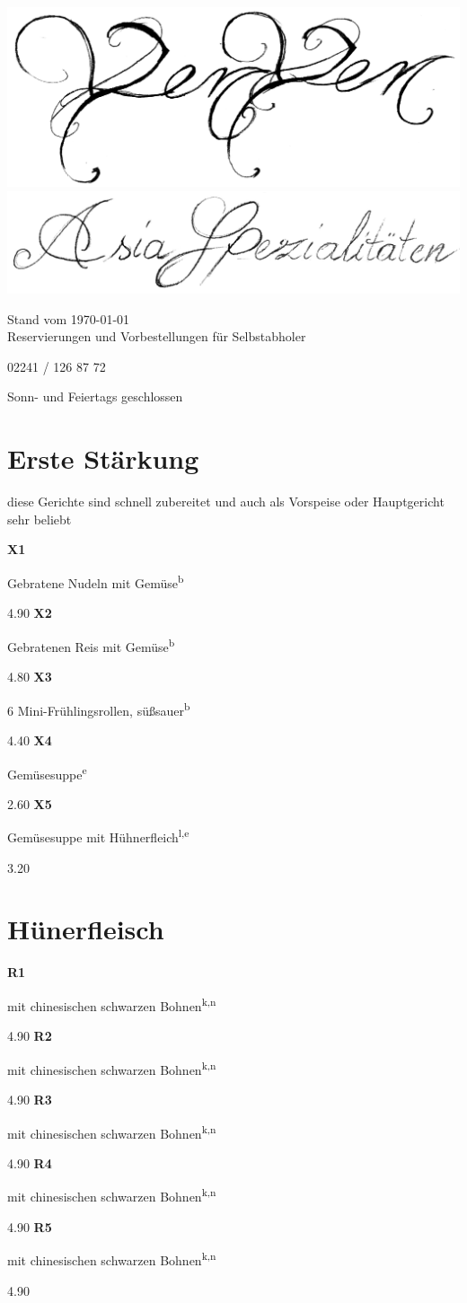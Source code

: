 \documentclass[a4paper,10pt,notumble]{leaflet}
\newcommand{\meal}[4]{\textbf{#1}\hspace{3mm}%
\begin{minipage}[t]{5.5 cm}
\begin{flushleft}
#2\textsuperscript{#3}
\end{flushleft}
\end{minipage}%
\hfill\SI{#4}{\EUR}\newline}
\newcommand{\Fisch}{b}
\newcommand{\Sellerie}{e}
\newcommand{\Senf}{k}
\newcommand{\Soja}{l}
\newcommand{\Erdnuss}{n}
\begin{document}
 

\begin{center}
\includegraphics[width=\textwidth]{gfx/yenyen_head}
\includegraphics[width=\textwidth]{gfx/Asia_Spezialitaeten}
\end{center}

{\small Stand vom \today}\\



Reservierungen und Vorbestellungen für Selbstabholer

{\Huge 02241 / 126 87 72}

Sonn- und Feiertags geschlossen\\

\section*{Erste Stärkung}
diese Gerichte sind schnell zubereitet und 
auch als Vorspeise oder Hauptgericht sehr beliebt
\begin{flushleft}
\meal{X1}{Gebratene Nudeln mit Gemüse}{\Fisch}{4.90}
\meal{X2}{Gebratenen Reis mit Gemüse}{\Fisch}{4.80}
\meal{X3}{6 Mini-Frühlingsrollen, süßsauer}{\Fisch}{4.40}
\meal{X4}{Gemüsesuppe}{\Sellerie}{2.60}
\meal{X5}{Gemüsesuppe mit Hühnerfleich}{\Soja,\Sellerie}{3.20}
\end{flushleft}


\section*{Hünerfleisch}
\meal{R1}{mit chinesischen schwarzen Bohnen}{\Senf,\Erdnuss}{4.90}
\meal{R2}{mit chinesischen schwarzen Bohnen}{\Senf,\Erdnuss}{4.90}
\meal{R3}{mit chinesischen schwarzen Bohnen}{\Senf,\Erdnuss}{4.90}
\meal{R4}{mit chinesischen schwarzen Bohnen}{\Senf,\Erdnuss}{4.90}
\meal{R5}{mit chinesischen schwarzen Bohnen}{\Senf,\Erdnuss}{4.90}
\end{document}
